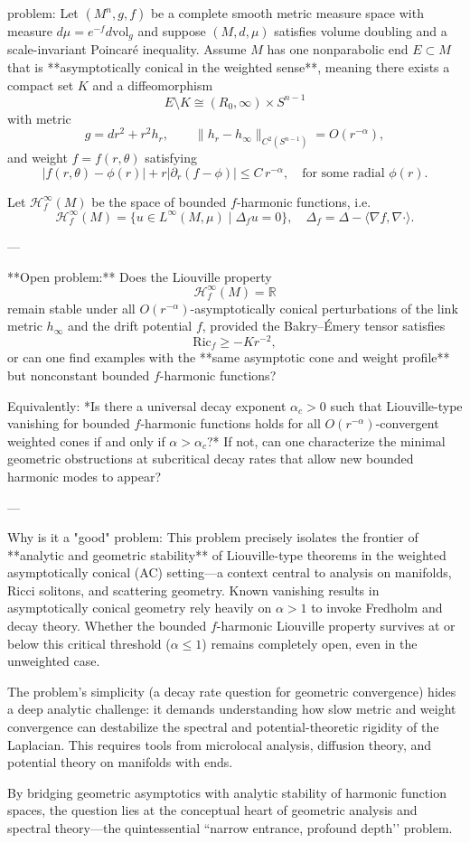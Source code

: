 problem:  
Let \((M^n,g,f)\) be a complete smooth metric measure space with measure \(d\mu = e^{-f}d\mathrm{vol}_g\) and suppose \((M,d,\mu)\) satisfies volume doubling and a scale-invariant Poincaré inequality.  
Assume \(M\) has one nonparabolic end \(E\subset M\) that is **asymptotically conical in the weighted sense**, meaning there exists a compact set \(K\) and a diffeomorphism  
\[
E\setminus K \cong (R_0,\infty)\times S^{n-1}
\]
with metric  
\[
g = dr^2 + r^2 h_r, \qquad \|h_r - h_\infty\|_{C^2(S^{n-1})} = O(r^{-\alpha}),
\]
and weight \(f=f(r,\theta)\) satisfying
\[
|f(r,\theta) - \phi(r)| + r |\partial_r(f-\phi)| \le C\, r^{-\alpha}, \quad \text{for some radial } \phi(r).
\]

Let \(\mathcal{H}_f^\infty(M)\) be the space of bounded \(f\)-harmonic functions, i.e.
\[
\mathcal{H}_f^\infty(M) = \{u \in L^\infty(M,\mu)\mid \Delta_f u = 0\}, \quad \Delta_f = \Delta - \langle\nabla f,\nabla\cdot\rangle.
\]

---

**Open problem:**  
Does the Liouville property
\[
\mathcal{H}_f^\infty(M) = \mathbb{R}
\]
remain stable under all \(O(r^{-\alpha})\)-asymptotically conical perturbations of the link metric \(h_\infty\) and the drift potential \(f\), provided the Bakry–Émery tensor satisfies
\[
\mathrm{Ric}_f \ge -K r^{-2},
\]
or can one find examples with the **same asymptotic cone and weight profile** but nonconstant bounded \(f\)-harmonic functions?

Equivalently: *Is there a universal decay exponent \(\alpha_c>0\) such that Liouville-type vanishing for bounded \(f\)-harmonic functions holds for all \(O(r^{-\alpha})\)-convergent weighted cones if and only if \(\alpha>\alpha_c\)?*  
If not, can one characterize the minimal geometric obstructions at subcritical decay rates that allow new bounded harmonic modes to appear?

---

Why is it a "good" problem:  
This problem precisely isolates the frontier of **analytic and geometric stability** of Liouville-type theorems in the weighted asymptotically conical (AC) setting—a context central to analysis on manifolds, Ricci solitons, and scattering geometry.  
Known vanishing results in asymptotically conical geometry rely heavily on \(\alpha>1\) to invoke Fredholm and decay theory. Whether the bounded \(f\)-harmonic Liouville property survives at or below this critical threshold (\(\alpha\le1\)) remains completely open, even in the unweighted case.  

The problem’s simplicity (a decay rate question for geometric convergence) hides a deep analytic challenge: it demands understanding how slow metric and weight convergence can destabilize the spectral and potential-theoretic rigidity of the Laplacian. This requires tools from microlocal analysis, diffusion theory, and potential theory on manifolds with ends.  

By bridging geometric asymptotics with analytic stability of harmonic function spaces, the question lies at the conceptual heart of geometric analysis and spectral theory—the quintessential “narrow entrance, profound depth’’ problem.
